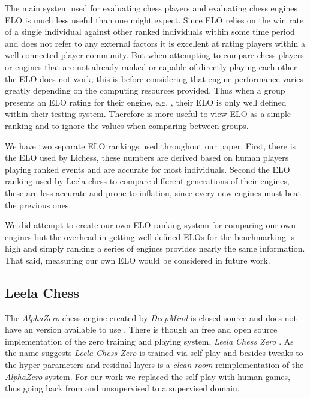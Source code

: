 \documentclass{article}
\begin{document}
The main system used for evaluating chess players and evaluating chess engines ELO \cite{glickman1995glicko} is much less useful than one might expect. Since ELO relies on the win rate of a single individual against other ranked individuals within some time period and does not refer to any external factors \cite{glickman1995glicko} it is excellent at rating players within a well connected player community. But when attempting to compare chess players or engines that are not already ranked or capable of directly playing each other the ELO does not work, this is before considering that engine performance varies greatly depending on the computing resources provided. Thus when a group presents an ELO rating for their engine, e.g. \citep{Silver1140}, their ELO is only well defined within their testing system. Therefore is more useful to view ELO as a simple ranking and to ignore the values when comparing between groups.

We have two separate ELO rankings used throughout our paper. First, there is the ELO used by Lichess, these numbers are derived based on human players playing ranked events and are accurate for most individuals. Second the ELO ranking used by Leela chess to compare different generations of their engines, these are less accurate and prone to inflation, since every new engines must beat the previous ones.

We did attempt to create our own ELO ranking system for comparing our own engines but the overhead in getting well defined ELOs for the benchmarking is high and simply ranking a series of engines provides nearly the same information. That said, measuring our own ELO would be considered in future work. 

\subsection{Leela Chess}

The \textit{AlphaZero} chess engine created by \textit{DeepMind} is closed source and does not have an version available to use \cite{Silver1140}. There is though an free and open source implementation of the zero training and playing system, \textit{Leela Chess Zero} \cite{leela}. As the name suggests \textit{Leela Chess Zero} is trained via self play and besides tweaks to the hyper parameters and residual layers is a \textit{clean room} reimplementation of the \textit{AlphaZero} system. For our work we replaced the self play with human games, thus going back from and unsupervised to a supervised domain.
\end{document}
